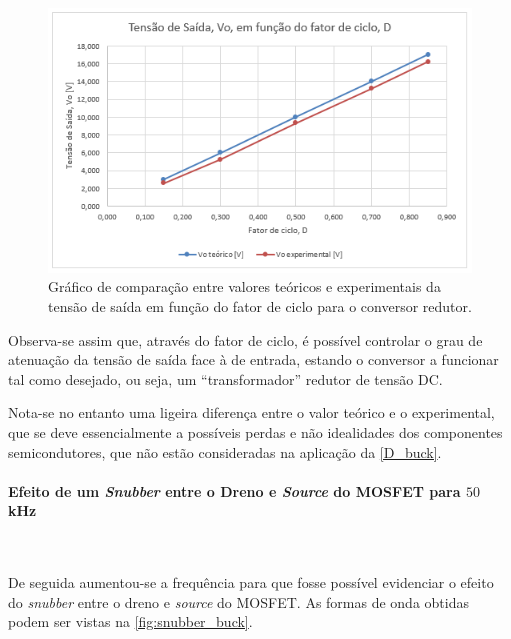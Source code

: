 \documentclass[a4paper,11pt]{article}
\numberwithin{equation}{section}
\begin{document}
\begin{figure}[H]
	\centering
	\includegraphics[keepaspectratio=true, scale=1.0]{teoricas/graf_buck}
	\caption{Gráfico de comparação entre valores teóricos e experimentais da tensão de saída em função do fator de ciclo para o conversor redutor.}
	\label{fig:graf_buck}
	\vspace{-0.8em}
\end{figure}

Observa-se assim que, através do fator de ciclo, é possível controlar o grau de atenuação da tensão de saída face à de entrada, estando o conversor a funcionar tal como desejado, ou seja, um ``transformador'' redutor de tensão DC.

Nota-se no entanto uma ligeira diferença entre o valor teórico e o experimental, que se deve essencialmente a possíveis perdas e não idealidades dos componentes semicondutores, que não estão consideradas na aplicação da \autoref{D_buck}.

\paragraph{Efeito de um \textit{Snubber} entre o Dreno e \textit{Source} do MOSFET para $50$ kHz}\mbox{}\

De seguida aumentou-se a frequência para que fosse possível evidenciar o efeito do \textit{snubber} entre o dreno e \textit{source} do MOSFET. As formas de onda obtidas podem ser vistas na \autoref{fig:snubber_buck}.
\end{document}
